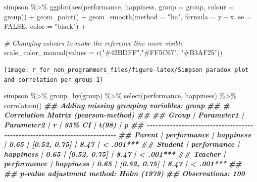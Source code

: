 \documentclass[
]{book}
\newenvironment{Shaded}{\begin{snugshade}}{\end{snugshade}}
\newcommand{\AttributeTok}[1]{\textcolor[rgb]{0.77,0.63,0.00}{#1}}
\newcommand{\CommentTok}[1]{\textcolor[rgb]{0.56,0.35,0.01}{\textit{#1}}}
\newcommand{\ConstantTok}[1]{\textcolor[rgb]{0.00,0.00,0.00}{#1}}
\newcommand{\DocumentationTok}[1]{\textcolor[rgb]{0.56,0.35,0.01}{\textbf{\textit{#1}}}}
\newcommand{\FunctionTok}[1]{\textcolor[rgb]{0.00,0.00,0.00}{#1}}
\newcommand{\NormalTok}[1]{#1}
\newcommand{\SpecialCharTok}[1]{\textcolor[rgb]{0.00,0.00,0.00}{#1}}
\newcommand{\StringTok}[1]{\textcolor[rgb]{0.31,0.60,0.02}{#1}}
\begin{document}
\begin{Shaded}
\begin{Highlighting}[]
\NormalTok{simpson }\SpecialCharTok{\%\textgreater{}\%} 
  \FunctionTok{ggplot}\NormalTok{(}\FunctionTok{aes}\NormalTok{(performance, happiness, }\AttributeTok{group =}\NormalTok{ group, }\AttributeTok{colour =}\NormalTok{ group)) }\SpecialCharTok{+}
  \FunctionTok{geom\_point}\NormalTok{() }\SpecialCharTok{+}
  \FunctionTok{geom\_smooth}\NormalTok{(}\AttributeTok{method =} \StringTok{"lm"}\NormalTok{,}
              \AttributeTok{formula =}\NormalTok{ y }\SpecialCharTok{\textasciitilde{}}\NormalTok{ x,}
              \AttributeTok{se =} \ConstantTok{FALSE}\NormalTok{,}
              \AttributeTok{color =} \StringTok{"black"}\NormalTok{) }\SpecialCharTok{+}
  
  \CommentTok{\# Changing colours to make the reference line more visible}
  \FunctionTok{scale\_color\_manual}\NormalTok{(}\AttributeTok{values =} \FunctionTok{c}\NormalTok{(}\StringTok{"\#42BDFF"}\NormalTok{,}\StringTok{"\#FF5C67"}\NormalTok{, }\StringTok{"\#B3AF25"}\NormalTok{))}
\end{Highlighting}
\end{Shaded}

\begin{center}\texttt{[image: r\_for\_non\_programmers\_files/figure-latex/Simpson paradox plot and correlation per group-1]} \end{center}

\begin{Shaded}
\begin{Highlighting}[]

\NormalTok{simpson }\SpecialCharTok{\%\textgreater{}\%} 
  \FunctionTok{group\_by}\NormalTok{(group) }\SpecialCharTok{\%\textgreater{}\%} 
  \FunctionTok{select}\NormalTok{(performance, happiness) }\SpecialCharTok{\%\textgreater{}\%} 
  \FunctionTok{correlation}\NormalTok{()}
\DocumentationTok{\#\# Adding missing grouping variables: \textasciigrave{}group\textasciigrave{}}
\DocumentationTok{\#\# \# Correlation Matrix (pearson{-}method)}
\DocumentationTok{\#\# }
\DocumentationTok{\#\# Group   |  Parameter1 | Parameter2 |    r |       95\% CI | t(98) |         p}
\DocumentationTok{\#\# {-}{-}{-}{-}{-}{-}{-}{-}{-}{-}{-}{-}{-}{-}{-}{-}{-}{-}{-}{-}{-}{-}{-}{-}{-}{-}{-}{-}{-}{-}{-}{-}{-}{-}{-}{-}{-}{-}{-}{-}{-}{-}{-}{-}{-}{-}{-}{-}{-}{-}{-}{-}{-}{-}{-}{-}{-}{-}{-}{-}{-}{-}{-}{-}{-}{-}{-}{-}{-}{-}{-}{-}{-}{-}{-}{-}}
\DocumentationTok{\#\# Parent  | performance |  happiness | 0.65 | [0.52, 0.75] |  8.47 | \textless{} .001***}
\DocumentationTok{\#\# Student | performance |  happiness | 0.65 | [0.52, 0.75] |  8.47 | \textless{} .001***}
\DocumentationTok{\#\# Teacher | performance |  happiness | 0.65 | [0.52, 0.75] |  8.47 | \textless{} .001***}
\DocumentationTok{\#\# }
\DocumentationTok{\#\# p{-}value adjustment method: Holm (1979)}
\DocumentationTok{\#\# Observations: 100}
\end{Highlighting}
\end{Shaded}
\end{document}
